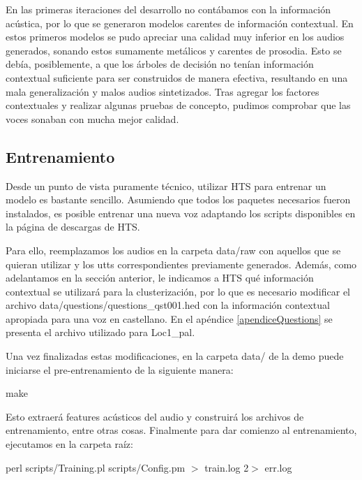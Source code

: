 En las primeras iteraciones del desarrollo no contábamos con la información acústica, por lo que se generaron modelos carentes de información contextual. En estos primeros modelos se pudo apreciar una calidad muy inferior en los audios generados, sonando estos sumamente metálicos y carentes de prosodia. Esto se debía, posiblemente, a que los árboles de decisión no tenían información contextual suficiente para ser construidos de manera efectiva, resultando en una mala generalización y malos audios sintetizados. Tras agregar los factores contextuales y realizar algunas pruebas de concepto, pudimos comprobar que las voces sonaban con mucha mejor calidad.


\subsection{Entrenamiento} \label{entrenamientoHTS}

Desde un punto de vista puramente técnico, utilizar HTS para entrenar un modelo es bastante sencillo. Asumiendo que todos los paquetes necesarios fueron instalados, es posible entrenar una nueva voz adaptando los scripts disponibles en la página de descargas de HTS.

Para ello, reemplazamos los audios en la carpeta data/raw con aquellos que se quieran utilizar y los utts correspondientes previamente generados. Además, como adelantamos en la sección anterior, le indicamos a HTS qué información contextual se utilizará para la clusterización, por lo que es necesario modificar el archivo data/questions/questions\_qst001.hed con la información contextual apropiada para una voz en castellano. En el apéndice \ref{apendiceQuestions} \completar se presenta el archivo utilizado para Loc1\_pal.

Una vez finalizadas estas modificaciones, en la carpeta data/ de la demo puede iniciarse el pre-entrenamiento de la siguiente manera:

\begin{tcolorbox}
make
\end{tcolorbox}

\noindent Esto extraerá features acústicos del audio y construirá los archivos de entrenamiento, entre otras cosas. Finalmente para dar comienzo al entrenamiento, ejecutamos en la carpeta raíz:

\begin{tcolorbox}
perl scripts/Training.pl scripts/Config.pm $>$ train.log 2$>$ err.log
\end{tcolorbox}

